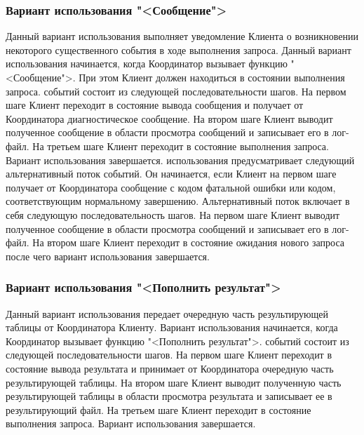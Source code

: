 \documentclass[11pt,oneside]{article}
\begin{document}
\subsubsection{Вариант использования "<Сообщение">}
Данный вариант использования выполняет уведомление Клиента о возникновении некоторого существенного события в ходе выполнения запроса. Данный вариант использования начинается, когда Координатор вызывает функцию "<Сообщение">. При этом Клиент должен находиться в состоянии выполнения запроса.
 событий состоит из следующей последовательности шагов. На первом шаге Клиент переходит в состояние вывода сообщения и получает от Координатора диагностическое сообщение. На втором шаге Клиент выводит полученное сообщение в области просмотра сообщений и записывает его в лог-файл. На третьем шаге Клиент переходит в состояние выполнения запроса. Вариант использования завершается.
 использования предусматривает следующий альтернативный поток событий. Он начинается, если Клиент на первом шаге получает от Координатора сообщение с кодом фатальной ошибки или кодом, соответствующим нормальному завершению. Альтернативный поток включает в себя следующую последовательность шагов. На первом шаге Клиент выводит полученное сообщение в области просмотра сообщений и записывает его в лог-файл. На втором шаге Клиент переходит в состояние ожидания нового запроса после чего вариант использования завершается.

\subsubsection{Вариант использования "<Пополнить результат">}
Данный вариант использования передает очередную часть результирующей таблицы от Координатора Клиенту. Вариант использования начинается, когда Координатор вызывает функцию "<Пополнить результат">.
 событий состоит из следующей последовательности шагов. На первом шаге Клиент переходит в состояние вывода результата и принимает от Координатора очередную часть результирующей таблицы. На втором шаге Клиент выводит полученную часть результирующей таблицы в области просмотра результата и записывает ее в результирующий файл. На третьем шаге Клиент переходит в состояние выполнения запроса. Вариант использования завершается.
\end{document}
